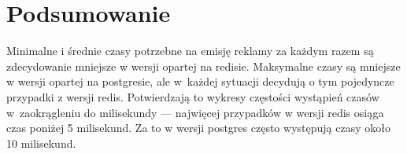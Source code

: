 \documentclass[a4paper,11pt]{article}
\begin{document}
\section{Podsumowanie}

Minimalne i średnie czasy potrzebne na emisję reklamy za każdym razem są zdecydowanie mniejsze w wersji opartej na redisie.
Maksymalne czasy są mniejsze w wersji opartej na postgresie, ale w~każdej sytuacji decydują o tym pojedyncze przypadki
z wersji redis. Potwierdzają to wykresy częstości wystąpień czasów w~zaokrągleniu do milisekundy --- najwięcej przypadków
w wersji redis osiąga czas poniżej 5 milisekund. Za to w wersji postgres często występują czasy około 10 milisekund.
\end{document}
